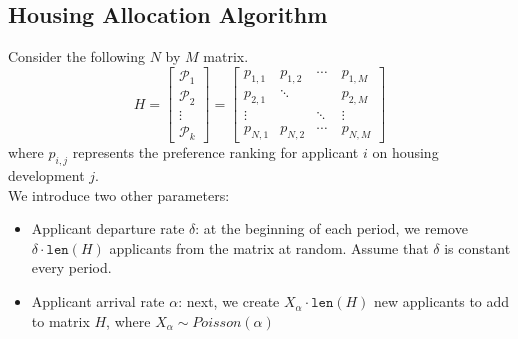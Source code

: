 \documentclass[11pt]{article}
\begin{document}
\subsection{Housing Allocation Algorithm}
Consider the following $N$ by $M$ matrix. 
\[H =
\begin{bmatrix}
    \mathcal{P}_1 \\
    \mathcal{P}_2 \\
    \vdots \\
    \mathcal{P}_k
\end{bmatrix}
=
\begin{bmatrix}
    p_{1,1} & p_{1,2} & \cdots & p_{1,M} \\
    p_{2,1} & \ddots & \quad & p_{2,M} \\
    \vdots & \quad & \ddots & \vdots \\
    p_{N,1} & p_{N,2} & \cdots & p_{N,M} 
\end{bmatrix}\]
where $p_{i,j}$ represents the preference ranking for applicant $i$ on housing development $j$. \\
\newline
We introduce two other parameters:
\begin{itemize}
    \item Applicant departure rate $\delta$: at the beginning of each period, we remove $\delta \cdot \texttt{len}(H)$ applicants from the matrix at random. Assume that $\delta$ is constant every period.
    \item Applicant arrival rate $\alpha$: next, we create $X_\alpha \cdot \texttt{len}(H)$ new applicants to add to matrix $H$, where $X_\alpha \sim Poisson(\alpha)$
\end{itemize}
\end{document}
